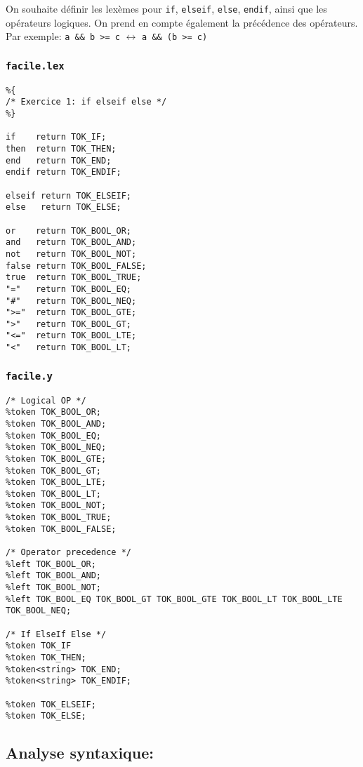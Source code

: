 \documentclass[11pt]{article}
\begin{document}
On souhaite définir les lexèmes pour \texttt{if}, \texttt{elseif},
\texttt{else}, \texttt{endif}, ainsi que les opérateurs logiques. On
prend en compte également la précédence des opérateurs. Par exemple:
\texttt{a\ \&\&\ b\ \textgreater{}=\ c} \(\leftrightarrow\)
\texttt{a\ \&\&\ (b\ \textgreater{}=\ c)}

\hypertarget{facile.lex}{%
\subsubsection{\texorpdfstring{\texttt{facile.lex}}{facile.lex}}\label{facile.lex}}

\begin{verbatim}
%{
/* Exercice 1: if elseif else */ 
%}

if    return TOK_IF;
then  return TOK_THEN;
end   return TOK_END;
endif return TOK_ENDIF;

elseif return TOK_ELSEIF;
else   return TOK_ELSE;

or    return TOK_BOOL_OR;
and   return TOK_BOOL_AND;
not   return TOK_BOOL_NOT;
false return TOK_BOOL_FALSE;
true  return TOK_BOOL_TRUE;
"="   return TOK_BOOL_EQ;
"#"   return TOK_BOOL_NEQ;
">="  return TOK_BOOL_GTE;
">"   return TOK_BOOL_GT;
"<="  return TOK_BOOL_LTE;
"<"   return TOK_BOOL_LT;
\end{verbatim}

\hypertarget{facile.y}{%
\subsubsection{\texorpdfstring{\texttt{facile.y}}{facile.y}}\label{facile.y}}

\begin{verbatim}
/* Logical OP */
%token TOK_BOOL_OR;
%token TOK_BOOL_AND;
%token TOK_BOOL_EQ;
%token TOK_BOOL_NEQ;
%token TOK_BOOL_GTE;
%token TOK_BOOL_GT;
%token TOK_BOOL_LTE;
%token TOK_BOOL_LT; 
%token TOK_BOOL_NOT;
%token TOK_BOOL_TRUE;
%token TOK_BOOL_FALSE;

/* Operator precedence */
%left TOK_BOOL_OR;
%left TOK_BOOL_AND;
%left TOK_BOOL_NOT;
%left TOK_BOOL_EQ TOK_BOOL_GT TOK_BOOL_GTE TOK_BOOL_LT TOK_BOOL_LTE TOK_BOOL_NEQ;

/* If ElseIf Else */
%token TOK_IF
%token TOK_THEN;
%token<string> TOK_END;
%token<string> TOK_ENDIF;

%token TOK_ELSEIF;
%token TOK_ELSE;
\end{verbatim}

    \hypertarget{analyse-syntaxique}{%
\subsection{Analyse syntaxique:}\label{analyse-syntaxique}}
\end{document}
